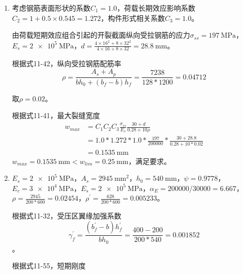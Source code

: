 \begin{enumerate}
\begin{align*}
          \end{align*}
          \par 根据式11-27，最大裂缝宽度
          \begin{align*}
              w_{max} & = \alpha_{cr} \psi \frac{\sigma_s}{E_s} (1.9 c + 0.08 \frac{d_{eq}}{\rho_{te}}) \\
                      & = 1.9 * 0.9778 * 217.9 / 200000 * (1.9 * 25 + 0.08 * 25 / 0.04908)              \\
                      & = \SI{0.1786}{\mm}
          \end{align*}
          \par 满足\gb{}的要求。
    \item 考虑钢筋表面形状的系数$C_1=1.0$，荷载长期效应影响系数$C_2=1+0.5 \times 0.545 = 1.272$，构件形式相关系数$C_3=1.0$。
          \par 由荷载短期效应组合引起的开裂截面纵向受拉钢筋的应力$\sigma_{ss} = \SI{197}{\MPa}$，$E_s = \SI{2e5}{\MPa}$，$d=\frac{4 \times 16^2 + 8 \times 32^2}{4 \times 16 + 8 \times 32} = \SI{28.8}{\mm}$。
          \par 根据式11-42，纵向受拉钢筋配筋率
          $$
              \rho = \frac{A_s+A_p}{bh_0+(b_f-b)h_f} = \frac{7238}{128*1200} = 0.04712
          $$
          \par 取$\rho=0.02$。
          \par 根据式11-41，最大裂缝宽度
          \begin{align*}
              w_{max} & = C_1C_2C_3\frac{\sigma_{ss}}{E_s}\frac{30+d}{0.28+10\rho}                    \\
                      & = 1.0 * 1.272 * 1.0 * \frac{197}{200000} * \frac{30 + 28.8}{0.28 + 10 * 0.02} \\
                      & = \SI{0.1535}{\mm}
          \end{align*}
          $w_{max} = \SI{0.1535}{\mm} < w_{lim} = \SI{0.25}{\mm}$，满足要求。
    \item $E_s = \SI{2e5}{\MPa}$，$A_s = \SI{2945}{\mm^2}$，$h_0=\SI{540}{\mm}$，$\psi=0.9778$，$E_c=\SI{3e4}{\MPa}$，$E_s=\SI{2e5}{\MPa}$，$\alpha_E=200000/30000=6.667$，$\rho=\frac{2945}{200*600}=0.02454$，$\rho^\prime=\frac{628}{200*600}=0.005233$。
          \par 根据式11-32，受压区翼缘加强系数
          $$\gamma_f^\prime = \frac{(b_f^\prime - b) h_f^\prime}{b h_0} = \frac{400-200}{200*540} = 0.001852$$。
          \par 根据式11-55，短期刚度
          \begin{align*}

\end{align*}
\end{enumerate}
